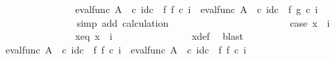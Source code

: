 \begin{isabellebody}
\ \ \ \ \ \ \ \ \ \ \ \ \isamarkupfalse%
\ \isamarkupfalse%
\ {\isachardoublequoteopen}{\isacharparenleft}{\kern0pt}eval{\isacharunderscore}{\kern0pt}func\ A\ {\isasymOmega}\ {\isasymcirc}\isactrlsub c\ id\isactrlsub c\ {\isasymOmega}\ {\isasymtimes}\isactrlsub f\ f{\isacharparenright}{\kern0pt}\ {\isasymcirc}\isactrlsub c\ {\isasymlangle}{\isasymf}{\isacharcomma}{\kern0pt}i{\isasymrangle}\ {\isacharequal}{\kern0pt}\ {\isacharparenleft}{\kern0pt}eval{\isacharunderscore}{\kern0pt}func\ A\ {\isasymOmega}\ {\isasymcirc}\isactrlsub c\ id\isactrlsub c\ {\isasymOmega}\ {\isasymtimes}\isactrlsub f\ g{\isacharparenright}{\kern0pt}\ {\isasymcirc}\isactrlsub c\ {\isasymlangle}{\isasymf}{\isacharcomma}{\kern0pt}i{\isasymrangle}{\isachardoublequoteclose}\isanewline
\ \ \ \ \ \ \ \ \ \ \ \ \ \ \isamarkupfalse%
\ {\isacharparenleft}{\kern0pt}simp\ add{\isacharcolon}{\kern0pt}\ calculation{\isacharparenright}{\kern0pt}\isanewline
\ \ \ \ \ \ \ \ \ \ \isamarkupfalse%
\isanewline
\ \ \ \ \ \ \ \ \ \ \ \ \isamarkupfalse%
\ case{}{\isacharcolon}{\kern0pt}\ {\isachardoublequoteopen}x\ {\isasymnoteq}\ {\isasymlangle}{\isasymf}{\isacharcomma}{\kern0pt}i{\isasymrangle}{\isachardoublequoteclose}\isanewline
\ \ \ \ \ \ \ \ \ \ \ \ \isamarkupfalse%
\ \isamarkupfalse%
\ x{\isacharunderscore}{\kern0pt}eq{\isacharcolon}{\kern0pt}\ {\isachardoublequoteopen}x\ {\isacharequal}{\kern0pt}\ {\isasymlangle}{\isasymt}{\isacharcomma}{\kern0pt}i{\isasymrangle}{\isachardoublequoteclose}\isanewline
\ \ \ \ \ \ \ \ \ \ \ \ \ \ \isamarkupfalse%
\ x{\isacharunderscore}{\kern0pt}def{}\ \isamarkupfalse%
\ blast\isanewline
\ \ \ \ \ \ \ \ \ \ \ \ \isamarkupfalse%
\ {\isachardoublequoteopen}{\isacharparenleft}{\kern0pt}eval{\isacharunderscore}{\kern0pt}func\ A\ {\isasymOmega}\ {\isasymcirc}\isactrlsub c\ {\isacharparenleft}{\kern0pt}id\isactrlsub c\ {\isasymOmega}\ {\isasymtimes}\isactrlsub f\ f{\isacharparenright}{\kern0pt}{\isacharparenright}{\kern0pt}\ {\isasymcirc}\isactrlsub c\ {\isasymlangle}{\isasymt}{\isacharcomma}{\kern0pt}i{\isasymrangle}\ {\isacharequal}{\kern0pt}\ eval{\isacharunderscore}{\kern0pt}func\ A\ {\isasymOmega}\ {\isasymcirc}\isactrlsub c\ {\isacharparenleft}{\kern0pt}{\isacharparenleft}{\kern0pt}id\isactrlsub c\ {\isasymOmega}\ {\isasymtimes}\isactrlsub f\ f{\isacharparenright}{\kern0pt}\ {\isasymcirc}\isactrlsub c\ {\isasymlangle}{\isasymt}{\isacharcomma}{\kern0pt}i{\isasymrangle}{\isacharparenright}{\kern0pt}{\isachardoublequoteclose}\isanewline

\end{isabellebody}
